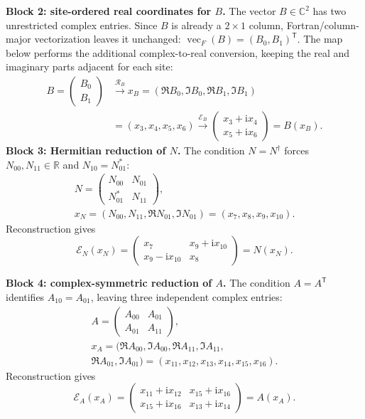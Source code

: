 \documentclass[10pt,letterpaper,twocolumn]{article}
\newcommand{\R}{\mathbb R}
\newcommand{\C}{\mathbb C}
\newcommand{\ii}{\mathrm i}
\begin{document}
\textbf{Block 2: site-ordered real coordinates for \(B\).}
The vector \(B\in\C^2\) has two unrestricted complex entries.  Since \(B\)
is already a \(2\times1\) column, Fortran/column-major vectorization leaves it
unchanged: \(\operatorname{vec}_{F}(B)=(B_0,B_1)^{\mathsf T}\).  The map below
performs the additional complex-to-real conversion, keeping the real and
imaginary parts adjacent for each site:
\[
\begin{aligned}
B=\begin{pmatrix}B_0\\B_1\end{pmatrix}
&\xrightarrow{\mathcal R_B}
x_B=(\Re B_0,\Im B_0,\Re B_1,\Im B_1)\\
&=(x_3,x_4,x_5,x_6)
\xrightarrow{\mathcal E_B}
\begin{pmatrix}
x_3+\ii x_4\\x_5+\ii x_6
\end{pmatrix}=B(x_B).
\end{aligned}
\tag{21}
\]
\textbf{Block 3: Hermitian reduction of \(N\).}
The condition \(N=N^\dagger\) forces \(N_{00},N_{11}\in\R\) and
\(N_{10}=N_{01}^\ast\):
\[
\begin{gathered}
N=
\begin{pmatrix}
N_{00}&N_{01}\\N_{01}^\ast&N_{11}
\end{pmatrix},\\
x_N=(N_{00},N_{11},\Re N_{01},\Im N_{01})
=(x_7,x_8,x_9,x_{10}).
\end{gathered}
\]
Reconstruction gives
\[
\mathcal E_N(x_N)=
\begin{pmatrix}
x_7&x_9+\ii x_{10}\\
x_9-\ii x_{10}&x_8
\end{pmatrix}=N(x_N).
\tag{22}
\]

\textbf{Block 4: complex-symmetric reduction of \(A\).}
The condition \(A=A^{\mathsf T}\) identifies \(A_{10}=A_{01}\), leaving three
independent complex entries:
\[
\begin{gathered}
A=\begin{pmatrix}A_{00}&A_{01}\\A_{01}&A_{11}\end{pmatrix},\\
x_A=(\Re A_{00},\Im A_{00},
\Re A_{11},\Im A_{11},\\
\Re A_{01},\Im A_{01})
=(x_{11},x_{12},x_{13},x_{14},x_{15},x_{16}).
\end{gathered}
\]
Reconstruction gives
\[
\mathcal E_A(x_A)=
\begin{pmatrix}
x_{11}+\ii x_{12} & x_{15}+\ii x_{16}\\
x_{15}+\ii x_{16} & x_{13}+\ii x_{14}
\end{pmatrix}=A(x_A).
\tag{23}
\]
\end{document}

